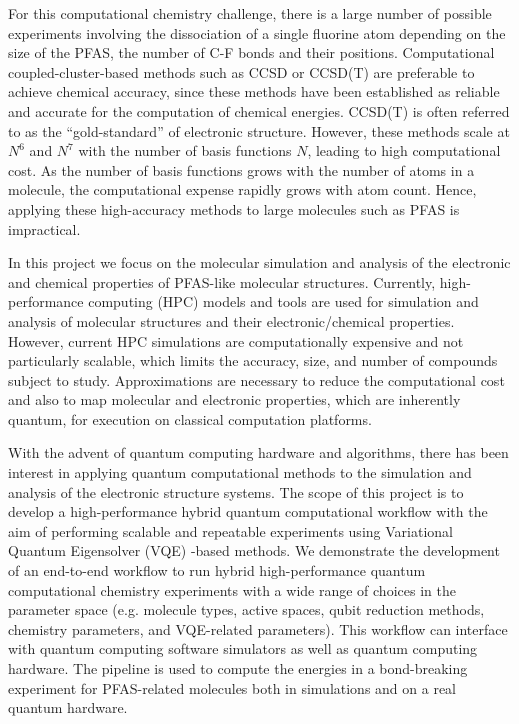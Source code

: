 \documentclass[journal,onecolumn]{IEEEtran}
\begin{document}
For this computational chemistry challenge, there is a large number of possible experiments involving the dissociation of a single fluorine atom depending on the size of the PFAS, the number of C-F bonds and their positions. 
Computational coupled-cluster-based methods such as CCSD or CCSD(T) are preferable to achieve chemical accuracy, since these methods have been established as reliable and accurate for the computation of chemical energies.
CCSD(T) is often referred to as the ``gold-standard'' of electronic structure. 
However, these methods scale at $N^6$ and $N^7$ with the number of basis functions $N$, leading to high computational cost. 
As the number of basis functions grows with the number of atoms in a molecule, the computational expense rapidly grows with atom count. 
Hence, applying these high-accuracy methods to large molecules such as PFAS is impractical.

In this project we focus on the molecular simulation and analysis of the electronic and chemical properties of PFAS-like molecular structures. 
Currently, high-performance computing (HPC) models and tools are used for simulation and analysis of molecular structures and their electronic/chemical properties. However, current HPC simulations are computationally expensive and not particularly scalable, which limits the accuracy, size, and number of compounds subject to study. Approximations are necessary to reduce the computational cost and also to map molecular and electronic properties, which are inherently quantum, for execution on classical computation platforms.

With the advent of quantum computing hardware and algorithms, there has been interest in applying quantum computational methods to the simulation and analysis of the electronic structure systems. 
The scope of this project is to develop a high-performance hybrid quantum computational workflow with the aim of performing scalable and repeatable experiments using Variational Quantum Eigensolver (VQE) -based methods\cite{Peruzzo2014-xz, OMalley2016-ph, Colless2018-hi, McCaskey2019-gk, Nam2020-ct, Kandala2017-kr, Kandala2019-rz, Gao2019-pp, Rice2021-mn, Gao2021-zt, Zhao2023-um, Goings2023-qr}. 
We demonstrate the development of an end-to-end workflow to run hybrid high-performance quantum computational chemistry experiments with a wide range of choices in the parameter space (e.g. molecule types, active spaces, qubit reduction methods, chemistry parameters, and VQE-related parameters).  
This workflow can interface with quantum computing software simulators as well as quantum computing hardware. 
The pipeline is used to compute the energies in a bond-breaking experiment for PFAS-related molecules both in simulations and on a real quantum hardware.
\end{document}
